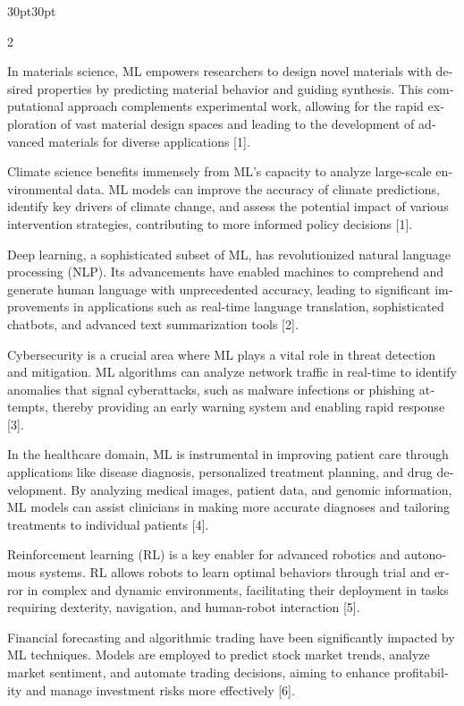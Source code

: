 \documentclass{article}
\begin{document}
\begin{adjustwidth}{30pt}{30pt}
\begin{multicols}{2}
\begin{otherlanguage}{english}
In materials science, ML empowers researchers to design novel materials with desired properties by predicting material behavior and guiding synthesis. This computational approach complements experimental work, allowing for the rapid exploration of vast material design spaces and leading to the development of advanced materials for diverse applications [1].

Climate science benefits immensely from ML's capacity to analyze large-scale environmental data. ML models can improve the accuracy of climate predictions, identify key drivers of climate change, and assess the potential impact of various intervention strategies, contributing to more informed policy decisions [1].

Deep learning, a sophisticated subset of ML, has revolutionized natural language processing (NLP). Its advancements have enabled machines to comprehend and generate human language with unprecedented accuracy, leading to significant improvements in applications such as real-time language translation, sophisticated chatbots, and advanced text summarization tools [2].

Cybersecurity is a crucial area where ML plays a vital role in threat detection and mitigation. ML algorithms can analyze network traffic in real-time to identify anomalies that signal cyberattacks, such as malware infections or phishing attempts, thereby providing an early warning system and enabling rapid response [3].

In the healthcare domain, ML is instrumental in improving patient care through applications like disease diagnosis, personalized treatment planning, and drug development. By analyzing medical images, patient data, and genomic information, ML models can assist clinicians in making more accurate diagnoses and tailoring treatments to individual patients [4].

Reinforcement learning (RL) is a key enabler for advanced robotics and autonomous systems. RL allows robots to learn optimal behaviors through trial and error in complex and dynamic environments, facilitating their deployment in tasks requiring dexterity, navigation, and human-robot interaction [5].

Financial forecasting and algorithmic trading have been significantly impacted by ML techniques. Models are employed to predict stock market trends, analyze market sentiment, and automate trading decisions, aiming to enhance profitability and manage investment risks more effectively [6].


\end{otherlanguage}
\end{multicols}
\end{adjustwidth}
\end{document}
